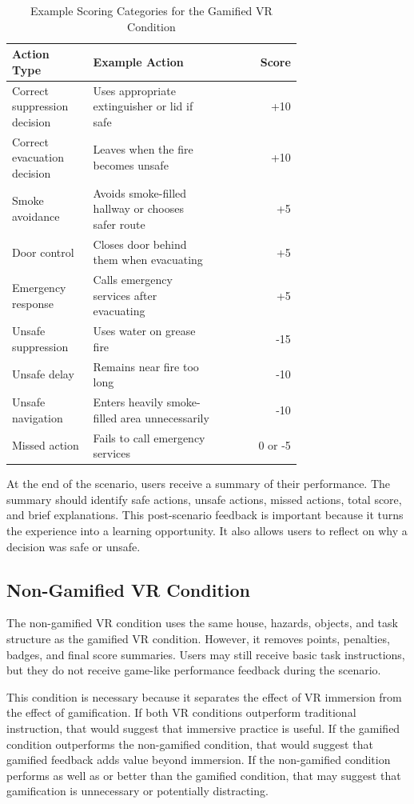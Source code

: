 \documentclass[manuscript, review]{acmart}
\begin{document}
{\begin{table}
  \caption{Example Scoring Categories for the Gamified VR Condition}
  \label{tab:scoring}
  \begin{tabular}{p{0.28\linewidth}p{0.44\linewidth}r}
    \toprule
    Action Type & Example Action & Score \\
    \midrule
    Correct suppression decision & Uses appropriate extinguisher or lid if safe & +10 \\
    Correct evacuation decision & Leaves when the fire becomes unsafe & +10 \\
    Smoke avoidance & Avoids smoke-filled hallway or chooses safer route & +5 \\
    Door control & Closes door behind them when evacuating & +5 \\
    Emergency response & Calls emergency services after evacuating & +5 \\
    Unsafe suppression & Uses water on grease fire & -15 \\
    Unsafe delay & Remains near fire too long & -10 \\
    Unsafe navigation & Enters heavily smoke-filled area unnecessarily & -10 \\
    Missed action & Fails to call emergency services & 0 or -5 \\
    \bottomrule
  \end{tabular}
\end{table}

At the end of the scenario, users receive a summary of their performance. The summary should identify safe actions, unsafe actions, missed actions, total score, and brief explanations. This post-scenario feedback is important because it turns the experience into a learning opportunity. It also allows users to reflect on why a decision was safe or unsafe.

\subsection{Non-Gamified VR Condition}

The non-gamified VR condition uses the same house, hazards, objects, and task structure as the gamified VR condition. However, it removes points, penalties, badges, and final score summaries. Users may still receive basic task instructions, but they do not receive game-like performance feedback during the scenario.

This condition is necessary because it separates the effect of VR immersion from the effect of gamification. If both VR conditions outperform traditional instruction, that would suggest that immersive practice is useful. If the gamified condition outperforms the non-gamified condition, that would suggest that gamified feedback adds value beyond immersion. If the non-gamified condition performs as well as or better than the gamified condition, that may suggest that gamification is unnecessary or potentially distracting.

}
\end{document}
